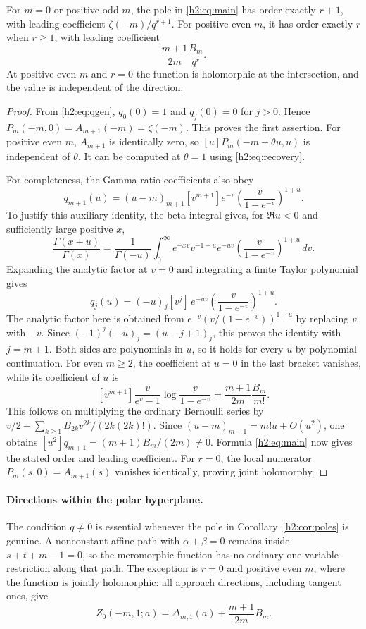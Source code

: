 \begin{corollary}
\label{h2:cor:poles}
For $m=0$ or positive odd $m$, the pole in \eqref{h2:eq:main} has order
exactly $r+1$, with leading coefficient
$\zeta(-m)/q^{r+1}$. For positive even $m$, it has order exactly $r$
when $r\ge1$, with leading coefficient
\[
 \frac{m+1}{2m}\frac{B_m}{q^r}.
\]
At positive even $m$ and $r=0$ the function is holomorphic at the
intersection, and the value is independent of the direction.
\end{corollary}
\begin{proof}
From \eqref{h2:eq:qgen}, $q_0(0)=1$ and $q_j(0)=0$ for $j>0$.
Hence $P_m(-m,0)=A_{m+1}(-m)=\zeta(-m)$. This proves the first
assertion. For positive even $m$, $A_{m+1}$ is identically zero, so
$[u]P_m(-m+\theta u,u)$ is independent of $\theta$. It can be
computed at $\theta=1$ using \eqref{h2:eq:recovery}.

For completeness, the Gamma-ratio coefficients also obey
\[
 q_{m+1}(u)=(u-m)_{m+1}[v^{m+1}]
                e^{-v}\left(\frac{v}{1-e^{-v}}\right)^{1+u}.
\]
To justify this auxiliary identity, the beta integral gives, for
$\Re u<0$ and sufficiently large positive $x$,
\[
 \frac{\Gamma(x+u)}{\Gamma(x)}
 =\frac1{\Gamma(-u)}\int_0^\infty e^{-xv}v^{-1-u}
       e^{-uv}\left(\frac{v}{1-e^{-v}}\right)^{1+u}\,dv.
\]
Expanding the analytic factor at $v=0$ and integrating a finite Taylor
polynomial gives
\[
 q_j(u)=(-u)_j[v^j]\,
          e^{-uv}\left(\frac{v}{1-e^{-v}}\right)^{1+u}.
\]
The analytic factor here is obtained from
$e^{-v}(v/(1-e^{-v}))^{1+u}$ by replacing $v$ with $-v$.
Since $(-1)^j(-u)_j=(u-j+1)_j$, this proves the identity with
$j=m+1$. Both sides are polynomials in $u$, so it holds for every $u$
by polynomial continuation.
For even $m\ge2$, the coefficient at $u=0$ in the last bracket
vanishes, while its coefficient of $u$ is
\[
 [v^{m+1}]\frac{v}{e^v-1}
                   \log\frac{v}{1-e^{-v}}
       =\frac{m+1}{2m}\frac{B_m}{m!}.
\]
This follows on multiplying the ordinary Bernoulli series by
$v/2-\sum_{k\ge1}B_{2k}v^{2k}/(2k(2k)!)$.
Since $(u-m)_{m+1}=m!u+O(u^2)$, one obtains
$[u^2]q_{m+1}=(m+1)B_m/(2m)\ne0$. Formula
\eqref{h2:eq:main} now gives the stated order and leading coefficient.
For $r=0$, the local numerator $P_m(s,0)=A_{m+1}(s)$ vanishes
identically, proving joint holomorphy.
\end{proof}

\paragraph{Directions within the polar hyperplane.}
The condition $q\ne0$ is essential whenever the pole in
Corollary~\ref{h2:cor:poles} is genuine. A nonconstant affine path with
$\alpha+\beta=0$ remains inside $s+t+m-1=0$, so the meromorphic function
has no ordinary one-variable restriction along that path. The exception
is $r=0$ and positive even $m$, where the function is jointly holomorphic:
all approach directions, including tangent ones, give
\[
 Z_0(-m,1;a)=\Delta_{m,1}(a)+\frac{m+1}{2m}B_m.
\]

